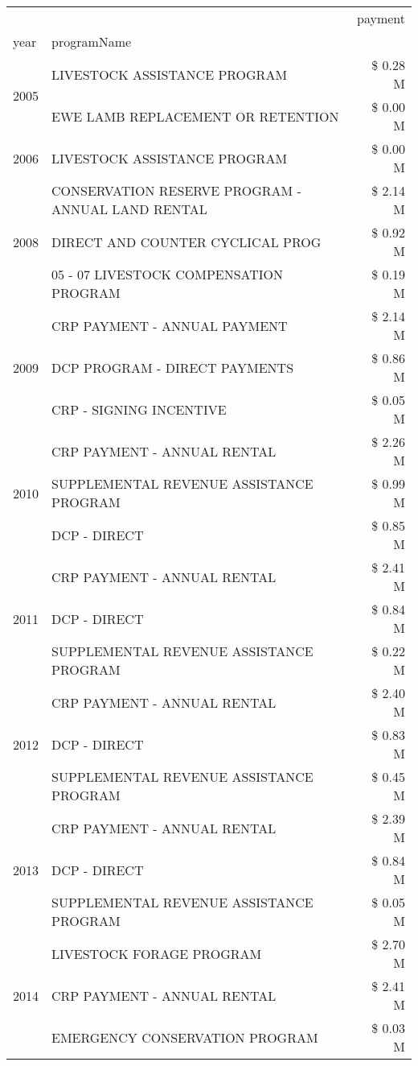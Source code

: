 \begin{tabular}{llr}
\toprule
 &  & payment \\
year & programName &  \\
\midrule
\multirow[t]{2}{*}{2005} & LIVESTOCK ASSISTANCE PROGRAM & \$ 0.28 M \\
 & EWE LAMB REPLACEMENT OR RETENTION & \$ 0.00 M \\
\cline{1-3}
2006 & LIVESTOCK ASSISTANCE PROGRAM & \$ 0.00 M \\
\cline{1-3}
\multirow[t]{3}{*}{2008} & CONSERVATION RESERVE PROGRAM - ANNUAL LAND RENTAL & \$ 2.14 M \\
 & DIRECT AND COUNTER CYCLICAL PROG & \$ 0.92 M \\
 & 05 - 07 LIVESTOCK COMPENSATION PROGRAM & \$ 0.19 M \\
\cline{1-3}
\multirow[t]{3}{*}{2009} & CRP PAYMENT - ANNUAL PAYMENT & \$ 2.14 M \\
 & DCP PROGRAM - DIRECT PAYMENTS & \$ 0.86 M \\
 & CRP - SIGNING INCENTIVE & \$ 0.05 M \\
\cline{1-3}
\multirow[t]{3}{*}{2010} & CRP PAYMENT - ANNUAL RENTAL & \$ 2.26 M \\
 & SUPPLEMENTAL REVENUE ASSISTANCE PROGRAM & \$ 0.99 M \\
 & DCP - DIRECT & \$ 0.85 M \\
\cline{1-3}
\multirow[t]{3}{*}{2011} & CRP PAYMENT - ANNUAL RENTAL & \$ 2.41 M \\
 & DCP - DIRECT & \$ 0.84 M \\
 & SUPPLEMENTAL REVENUE ASSISTANCE PROGRAM & \$ 0.22 M \\
\cline{1-3}
\multirow[t]{3}{*}{2012} & CRP PAYMENT - ANNUAL RENTAL & \$ 2.40 M \\
 & DCP - DIRECT & \$ 0.83 M \\
 & SUPPLEMENTAL REVENUE ASSISTANCE PROGRAM & \$ 0.45 M \\
\cline{1-3}
\multirow[t]{3}{*}{2013} & CRP PAYMENT - ANNUAL RENTAL & \$ 2.39 M \\
 & DCP - DIRECT & \$ 0.84 M \\
 & SUPPLEMENTAL REVENUE ASSISTANCE PROGRAM & \$ 0.05 M \\
\cline{1-3}
\multirow[t]{3}{*}{2014} & LIVESTOCK FORAGE PROGRAM & \$ 2.70 M \\
 & CRP PAYMENT - ANNUAL RENTAL & \$ 2.41 M \\
 & EMERGENCY CONSERVATION PROGRAM & \$ 0.03 M \\
\cline{1-3}

\end{tabular}
